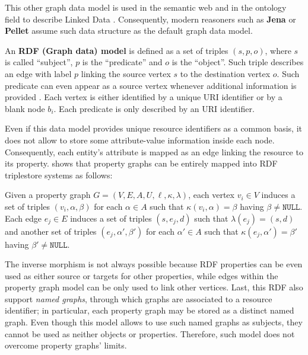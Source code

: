 \label{sec:rdfmodel}
This other graph data model is used in the semantic web  and in the ontology field to describe Linked Data
\cite{NautiLOD,Hartig2015}.  Consequently, modern reasoners such as \textbf{Jena} \cite{Jena} or \textbf{Pellet} \cite{Pellet}
assume such data structure as the default graph data model.

\begin{definition}
	An \textbf{RDF (Graph data) model} \cite{GutierrezInclusion} is defined as a
	set of triples $(s,p,o)$, where $s$ is called ``subject'', $p$ is the ``predicate'' and $o$ is the ``object''.
	Such triple describes an edge with label $p$ linking the source vertex $s$ to the destination vertex $o$.
	Such predicate can even appear as a source vertex
	whenever additional information is provided \cite{DasSPCB14}.
	 Each
	vertex is either identified by a unique URI identifier or by a blank node $b_i$. Each predicate is only described by
	an URI identifier. \qedsymbol
\end{definition}

Even if this data model provides unique resource identifiers as a common basis, it does not allow to store some
attribute-value information inside each node. Consequently, each entity's attribute is mapped as an edge linking the
resource to its property.
 \cite{DasSPCB14} shows that
 property graphs can be entirely mapped into RDF triplestore systems
 as follows:
 \begin{definition}\label{def:map}
 	Given a property graph $G=(V,E,A,U,\ell,\kappa,\lambda)$, each vertex
 	$v_i\in V$ induces a set of triples $(v_i,\alpha,\beta)$ for each $\alpha\in A$ such that $\kappa(v_i,\alpha)=\beta$
 	having $\beta\neq\texttt{NULL}$. Each edge $e_j\in E$ induces a set of triples $(s,e_j,d)$ such that
 	$\lambda(e_j)=(s,d)$ and another set of triples $(e_j,\alpha',\beta')$ for each $\alpha'\in A$ such that
 	$\kappa(e_j,\alpha')=\beta'$ having $\beta'\neq\texttt{NULL}$.
 \end{definition}

The inverse morphism is not always possible because RDF properties can be even used as either source or targets for other properties, while edges within the property graph model can be only used to link other vertices. Last, this RDF also support \textit{named graphs}, through which graphs are associated to a resource identifier; in particular, each property graph may be stored as a distinct named graph. Even though this model allows to use such named graphs as subjects, they cannot be used as neither objects or properties. Therefore, such model does not overcome property graphs' limits.